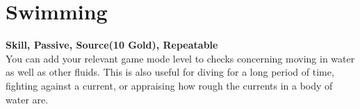 \section{Swimming}\label{sec:swimming}
\textbf{Skill, Passive, Source(10 Gold), Repeatable}\\
You can add your relevant game mode level to checks concerning moving in water as well as other fluids.
This is also useful for diving for a long period of time, fighting against a current, or appraising how rough the currents in a body of water are.